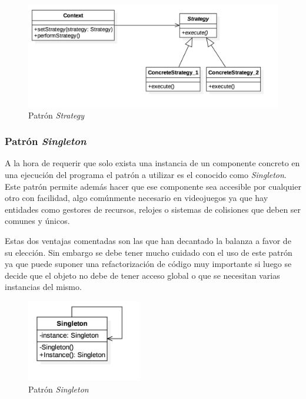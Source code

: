 \bigskip

\begin{figure}
	\includegraphics[width=15cm]{otros/UML/png/strategy.png}
	\caption{Patrón \textit{Strategy}}
	\label{pat:strategy}
\end{figure}


\subsubsection{Patrón \textit{Singleton}}

A la hora de requerir que solo exista una instancia de un componente concreto en una ejecución del programa el patrón a utilizar es el conocido como \textit{Singleton}. Este patrón permite además hacer que ese componente sea accesible por cualquier otro con facilidad, algo comúnmente necesario en videojuegos ya que hay entidades como gestores de recursos, relojes o sistemas de colisiones que deben ser comunes y únicos.

\bigskip

Estas dos ventajas comentadas son las que han decantado la balanza a favor de su elección. Sin embargo se debe tener mucho cuidado con el uso de este patrón ya que puede suponer una refactorización de código muy importante si luego se decide que el objeto no debe de tener acceso global o que se necesitan varias instancias del mismo.

\bigskip

\begin{figure}
	\centerline{\includegraphics[width=5cm]{otros/UML/png/singleton.png}}
	\caption{Patrón \textit{Singleton}}
	\label{pat:singleton}
\end{figure}

